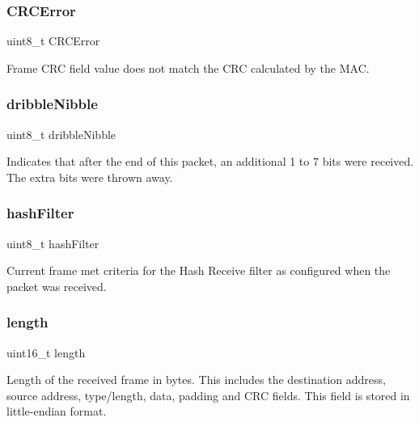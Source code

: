 \mbox{\label{struct_r_s_v_a331925f67a8efb3a251601448de7b1eb}} 
\subsubsection{\texorpdfstring{CRCError}{CRCError}}
{\footnotesize\ttfamily uint8\+\_\+t C\+R\+C\+Error}



Frame C\+RC field value does not match the C\+RC calculated by the M\+AC. 

\mbox{\label{struct_r_s_v_a907e981c9915dc72df656689b5ff1f62}} 
\subsubsection{\texorpdfstring{dribbleNibble}{dribbleNibble}}
{\footnotesize\ttfamily uint8\+\_\+t dribble\+Nibble}



Indicates that after the end of this packet, an additional 1 to 7 bits were received. The extra bits were thrown away. 

\mbox{\label{struct_r_s_v_a4ebbb06c87ec613dd00b55ed91c67535}} 
\subsubsection{\texorpdfstring{hashFilter}{hashFilter}}
{\footnotesize\ttfamily uint8\+\_\+t hash\+Filter}



Current frame met criteria for the Hash Receive filter as configured when the packet was received. 

\mbox{\label{struct_r_s_v_a1892eba2086d12ac2b09005aeb09ea3b}} 
\subsubsection{\texorpdfstring{length}{length}}
{\footnotesize\ttfamily uint16\+\_\+t length}

Length of the received frame in bytes. This includes the destination address, source address, type/length, data, padding and C\+RC fields. This field is stored in little-\/endian format. \mbox{\label{struct_r_s_v_aa1ee2560cad39e2579609aa0bbe23622}} 
